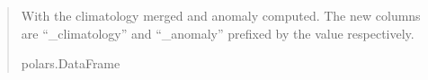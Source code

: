 \documentclass[letterpaper,10pt,english]{sphinxmanual}
\begin{document}
\begin{fulllineitems}
\begin{quote}
\begin{description}
\begin{itemize}
\end{itemize}

\sphinxAtStartPar
{} \textendash{} With the climatology merged and anomaly computed. The new columns are
“\_climatology” and “\_anomaly” prefixed by the  value
respectively.

\sphinxAtStartPar
polars.DataFrame

\end{description}\end{quote}

\end{fulllineitems}

\end{document}
